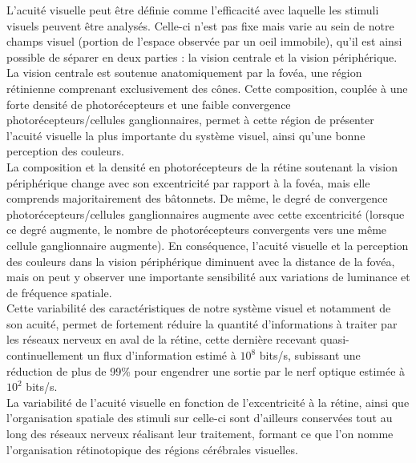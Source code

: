 L'acuité visuelle peut être définie comme l'efficacité  avec laquelle les stimuli visuels peuvent être analysés. Celle-ci n'est pas fixe mais varie au sein de notre champs visuel (portion de l'espace observée par un oeil immobile), qu'il est ainsi possible de séparer en deux parties : la vision centrale et la vision périphérique.\autocite{Werner2014} \\
La vision centrale est soutenue anatomiquement par la fovéa, une région rétinienne comprenant exclusivement des cônes. Cette composition, couplée à une forte densité de photorécepteurs et une faible convergence photorécepteurs/cellules ganglionnaires, permet à cette région de présenter l'acuité visuelle la plus importante du système visuel, ainsi qu'une bonne perception des couleurs. \autocite{Werner2014} \\
La composition et la densité en photorécepteurs de la rétine soutenant la vision périphérique change avec son excentricité par rapport à la fovéa, mais elle comprends majoritairement des bâtonnets. 
De même, le degré de convergence photorécepteurs/cellules ganglionnaires augmente avec cette excentricité (lorsque ce degré augmente, le nombre de photorécepteurs convergents vers une même cellule ganglionnaire augmente).
En conséquence, l'acuité visuelle et la perception des couleurs dans la vision périphérique diminuent avec la distance de la fovéa, mais on peut y observer une importante sensibilité aux variations de luminance et de fréquence spatiale. \autocite{Werner2014} \\
Cette variabilité des caractéristiques de notre système visuel et notamment de son acuité, permet de fortement réduire la quantité d'informations à traiter par les réseaux nerveux en aval de la rétine, cette dernière recevant quasi-continuellement un flux d'information estimé à $10^{8}$ bits/s, subissant une réduction de plus de 99\% pour engendrer une sortie par le nerf optique estimée à $10^{2}$ bits/s. \autocite{Kortum1996, Werner2014, Zhaoping2014} \\
La variabilité de l'acuité visuelle en fonction de l'excentricité à la rétine, ainsi que l'organisation spatiale des stimuli sur celle-ci sont d'ailleurs conservées tout au long des réseaux nerveux réalisant leur traitement, formant ce que l'on nomme l'organisation rétinotopique des régions cérébrales visuelles. \autocite{Werner2014} \\

